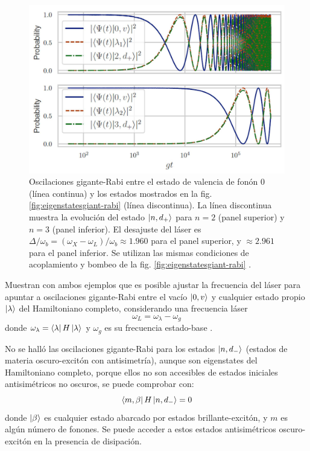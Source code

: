 \documentclass[main.tex]{subfiles}
\begin{document}
\begin{figure}[th]
	\centering
	\includegraphics[width=0.7\linewidth]{img/EigenstatesGiant-Rabi1}
	\caption{Oscilaciones gigante-Rabi entre el estado de valencia de fonón $0$ (línea continua) y los estados mostrados en la fig. \ref{fig:eigenstatesgiant-rabi} (línea discontinua). La línea discontinua muestra la evolución del estado $\ket{n,d_+}$ para $n = 2$ (panel superior) y $n = 3$ (panel inferior). El desajuste del láser es $\Delta/\omega_b = (\omega_X-\omega_L)/\omega_b \approx 1.960$ para el panel superior, y $\approx 2.961$ para el panel inferior. Se utilizan las mismas condiciones de acoplamiento y bombeo de la fig. \ref{fig:eigenstatesgiant-rabi} \parencite{Vargas2022}.}
	\label{fig:eigenstatesgiant-rabi1}
\end{figure}

Muestran con ambos ejemplos que es posible ajustar la frecuencia del láser para apuntar a oscilaciones gigante-Rabi entre el vacío $\ket{0,v}$ y cualquier estado propio $\ket{\lambda}$ del Hamiltoniano completo, considerando una frecuencia láser
\begin{equation}
	\omega_L = \omega_\lambda - \omega_g
\end{equation}
donde $\omega_\lambda = \bra{\lambda}H\ket{\lambda}$ y $\omega_g$ es su frecuencia estado-base \parencite{Bin2020}. 

No se halló las oscilaciones gigante-Rabi para los estados $\ket{n,d_-}$ (estados de materia oscuro-excitón con antisimetría), aunque son eigenstates del Hamiltoniano completo, porque ellos no son accesibles de estados iniciales antisimétricos no oscuros, se puede comprobar con:
\begin{equation}
	\bra{m,\beta}H\ket{n,d_-} = 0
\end{equation}
donde $\ket{\beta}$ es cualquier estado abarcado por estados brillante-excitón, y $m$ es algún número de fonones. Se puede acceder a estos estados antisimétricos oscuro-excitón en la presencia de disipación.
\end{document}
